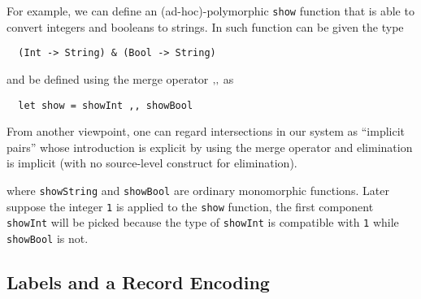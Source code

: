 For example, we can define an (ad-hoc)-polymorphic \lstinline{show} function
that is able to convert integers and booleans to strings. In \name such function
can be given the type

\begin{lstlisting}
  (Int -> String) & (Bool -> String)
\end{lstlisting}

and be defined using the merge operator $ ,\!, $ as

\begin{lstlisting}
  let show = showInt ,, showBool
\end{lstlisting}

From another viewpoint, one can regard intersections in our system as ``implicit
pairs'' whose introduction is explicit by using the merge operator and
elimination is implicit (with no source-level construct for
elimination). 

where \lstinline{showString} and \lstinline{showBool} are ordinary monomorphic
functions. Later suppose the integer \lstinline{1} is applied to the \lstinline{show} function,
the first component \lstinline{showInt} will be picked because the type of \lstinline{showInt}
is compatible with \lstinline{1} while \lstinline{showBool} is not.








\subsection{Labels and a Record Encoding}


